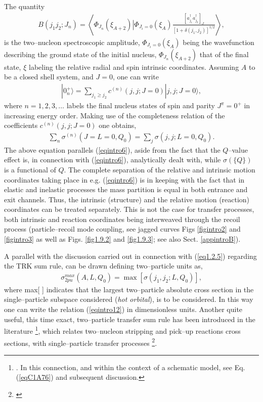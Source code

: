 The quantity
\begin{align}
B(j_1j_2;J_n)=\left\langle \Phi_{J_n}(\xi_{A+2})\left|\Phi_{J_i=0}(\xi_A)\right.\frac{\left[a^\dagger_{j_1}a^\dagger_{j_2}\right]_J}{\left[1+\delta(j_1,j_2)\right]^{1/2}}\right\rangle,
\end{align}
is the two--nucleon spectroscopic amplitude, $\Phi_{J_i=0}(\xi_A)$ being the wavefunction describing the ground state of the initial nucleus, $\Phi_{J_n}(\xi_{A+2})$ that of the final state, $\xi$ labeling the relative radial and spin intrinsic coordinates. Assuming $A$ to be a closed shell system, and $J=0$, one can write
\begin{align}
|0^+_n\rangle=\sum_{j_1\geq j_2}c^{(n)}(j,j;J=0)|j,j;J=0\rangle,
\end{align}
where $n=1,2,3,\dots$ labels the final nucleus states of spin and parity $J^\pi=0^+$ in increasing energy order. Making use of the completeness relation of the coefficients $c^{(n)}(j,j;J=0)$ one obtains,
\begin{align}\label{eqintro12}
\sum_n \sigma^{(n)}(J=L=0,Q_0)=\sum_j\sigma(j,j;L=0,Q_0).
\end{align}
The above equation parallels (\ref{eqintro6}), aside from the fact that the $Q$--value effect is, in connection with (\ref{eqintro6}), analytically dealt with, while $\sigma(\{Q\})$ is a functional of $Q$. The complete separation of the relative and intrinsic motion coordinates taking place in e.g. (\ref{eqintro6}) is in keeping with the fact that in elastic and inelastic processes the mass partition is equal in both entrance and exit channels. Thus, the intrinsic (structure) and the relative motion (reaction) coordinates can be treated separately. This is not the case for transfer processes, both intrinsic and reaction coordinates being interweaved through the recoil process (particle--recoil mode coupling, see jagged curves Figs \ref{figintro2} and \ref{figintro3} as well as Figs. \ref{fig1.9.2} and \ref{fig1.9.3}; see also Sect. \ref{appintroB}). 





A parallel with the discussion carried out in connection with (\ref{eq1.2.5}) regarding the TRK sum rule, can be drawn defining two--particle units as,
\begin{align}
\sigma^{max}_{2pu}(A,L,Q_0)=\max \left[\sigma(j_1,j_2;L,Q_0)\right],
\end{align}
where max[ ] indicates that the largest two--particle absolute cross section in the single--particle subspace considered (\textit{hot orbital}), is to be considered. In this way one can write the relation (\ref{eqintro12}) in dimensionless units.  Another quite useful, this time exact, two--particle transfer sum rule has been introduced in the literature \footnote{\cite{Bayman:72}. In this connection, and within the context of a schematic model, see Eq. (\ref{eqC1A76}) and subsequent discussion.}, which relates two--nucleon stripping and pick--up reactions cross sections, with single--particle transfer processes \footnote{\cite{Lanford:77}}.


